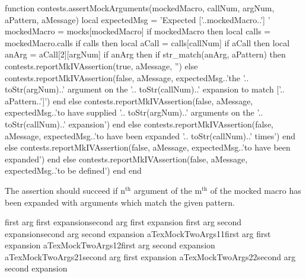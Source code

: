 \startLuaCode
function contests.assertMockArguments(mockedMacro,
                                      callNum,
                                      argNum,
                                      aPattern,
                                      aMessage)
  local expectedMsg = 'Expected ['..mockedMacro..'] '
  mockedMacro = mocks[mockedMacro]
  if mockedMacro then
    local calls = mockedMacro.calls
    if calls then
      local aCall = calls[callNum]
      if aCall then
        local anArg = aCall[2][argNum]
        if anArg then
          if str_match(anArg, aPattern) then
            contests.reportMkIVAssertion(true, aMessage, '')
          else
            contests.reportMkIVAssertion(false, aMessage,
              expectedMsg..'the '..
              toStr(argNum)..' argument on the '..
              toStr(callNum)..' expansion to match ['..
              aPattern..']')
          end
        else
          contests.reportMkIVAssertion(false, aMessage,
            expectedMsg..'to have supplied '..
            toStr(argNum)..' arguments on the '..
            toStr(callNum)..' expansion')
        end
      else
        contests.reportMkIVAssertion(false, aMessage,
          expectedMsg..'to have been expanded '..
          toStr(callNum)..' times')
      end
    else
      contests.reportMkIVAssertion(false, aMessage,
        expectedMsg..'to have been expanded')
    end
  else
    contests.reportMkIVAssertion(false, aMessage,
      expectedMsg..'to be defined')
  end
end
\stopLuaCode


The \type{\assertMockNthArgumentOnMthExpansionMatches} assertion should 
succeed if $\text{n}^{\text{th}}$ argument of the $\text{m}^{\text{th}}$ 
of the mocked macro has been expanded with arguments which match the given 
pattern. 

\startConTest
\startMocking
  \aTexMockTwoArgs%
    {first arg first expansion}{second arg first expansion}
  \aTexMockTwoArgs%
    {first arg second expansion}{second arg second expansion}
  \assertMockNthArgumentOnMthExpansionMatches%
    {aTexMockTwoArgs}{1}{1}{first arg first expansion}{}
  \assertMockNthArgumentOnMthExpansionMatches%
    {aTexMockTwoArgs}{1}{2}{first arg second expansion}{}
  \assertMockNthArgumentOnMthExpansionMatches%
    {aTexMockTwoArgs}{2}{1}{second arg first expansion}{}
  \assertMockNthArgumentOnMthExpansionMatches%
    {aTexMockTwoArgs}{2}{2}{second arg second expansion}{}
\stopMocking
\stopConTest

